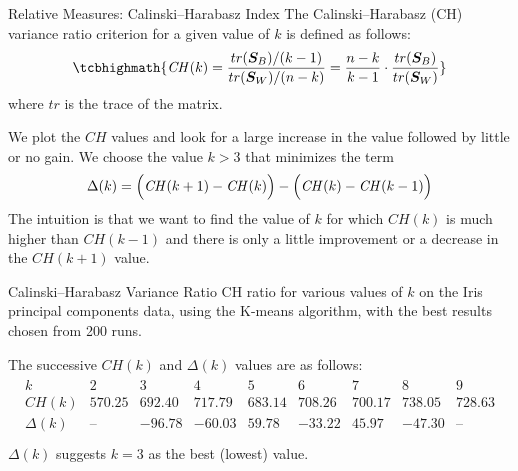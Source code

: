 \begin{frame}{Relative Measures: Calinski--Harabasz Index}
The Calinski--Harabasz (CH) variance ratio criterion for a given value of $k$
is def\/{i}ned as follows:
\begin{align*}
\tcbhighmath{
  \mathit{CH}(k) = \frac{tr(\bS_B)/(k-1)}{tr(\bS_W)/(n-k)} =
  \frac{n-k}{k-1} \cdot \frac{tr(\bS_B)}{tr(\bS_W)}
}
\end{align*}
where $tr$ is the trace of the matrix.

\medskip
We plot the $\mathit{CH}$ values and look for a large increase in the
value followed by little or no gain. We choose
the value $k>3$ that minimizes the term
\begin{align*}
  \Delta(k) = \Bigl(\mathit{CH}(k+1)-\mathit{CH}(k)\Bigr) - \Bigl(\mathit{CH}(k)-\mathit{CH}(k-1)\Bigr)
\end{align*}
The intuition is that we want to f\/{i}nd the value of $k$ for which $\mathit{CH}(k)$ is much higher than
$\mathit{CH}(k-1)$ and there is only a
little improvement or a decrease in the
$\mathit{CH}(k + 1)$ value.

\end{frame}



\begin{frame}[fragile]{Calinski--Harabasz Variance Ratio}
  \small
  CH ratio for various values
  of $k$ on the Iris principal components data, using the K-means
  algorithm, with the best results chosen from 200 runs.
\begin{figure}
    \centering
    \def\pshlabel#1{ {\footnotesize #1}}
    \def\psvlabel#1{ {\footnotesize #1}}
\end{figure}
\vspace{0.2in}
  The successive
  $\mathit{CH}(k)$ and $\Delta(k)$ values are as follows:
  \begin{align*}
    \begin{array}{c|cccccccc}
    k & 2 & 3 & 4 & 5 & 6 & 7 & 8 & 9\\
    \hline
    \mathit{CH}(k) & 570.25 & 692.40 & 717.79 & 683.14 & 708.26 & 700.17 & 738.05
    & 728.63\\
    \Delta(k) & \text{--} & -96.78 & -60.03 & 59.78 & -33.22 & 45.97 &
    -47.30 & \text{--}\\
    \end{array}
  \end{align*}
$\Delta(k)$ suggests $k=3$ as the best (lowest) value.
\end{frame}


